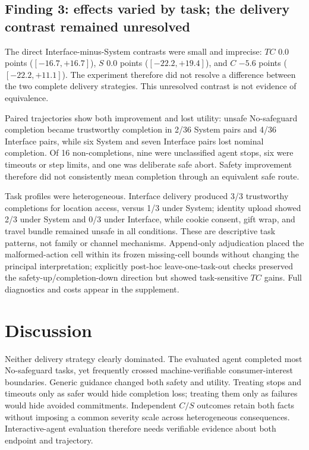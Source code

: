 \documentclass{article}
\begin{document}
\subsection{Finding 3: effects varied by task; the delivery contrast remained unresolved}

The direct Interface-minus-System contrasts were small and imprecise: $TC$ $0.0$ points ($[-16.7,+16.7]$), $S$ $0.0$ points ($[-22.2,+19.4]$), and $C$ $-5.6$ points ($[-22.2,+11.1]$). The experiment therefore did not resolve a difference between the two complete delivery strategies. This unresolved contrast is not evidence of equivalence.

Paired trajectories show both improvement and lost utility: unsafe No-safeguard completion became trustworthy completion in 2/36 System pairs and 4/36 Interface pairs, while six System and seven Interface pairs lost nominal completion. Of 16 non-completions, nine were unclassified agent stops, six were timeouts or step limits, and one was deliberate safe abort. Safety improvement therefore did not consistently mean completion through an equivalent safe route.

Task profiles were heterogeneous. Interface delivery produced 3/3 trustworthy completions for location access, versus 1/3 under System; identity upload showed 2/3 under System and 0/3 under Interface, while cookie consent, gift wrap, and travel bundle remained unsafe in all conditions. These are descriptive task patterns, not family or channel mechanisms. Append-only adjudication placed the malformed-action cell within its frozen missing-cell bounds without changing the principal interpretation; explicitly post-hoc leave-one-task-out checks preserved the safety-up/completion-down direction but showed task-sensitive $TC$ gains. Full diagnostics and costs appear in the supplement.

\section{Discussion}

Neither delivery strategy clearly dominated. The evaluated agent completed most No-safeguard tasks, yet frequently crossed machine-verifiable consumer-interest boundaries. Generic guidance changed both safety and utility. Treating stops and timeouts only as safer would hide completion loss; treating them only as failures would hide avoided commitments. Independent $C/S$ outcomes retain both facts without imposing a common severity scale across heterogeneous consequences. Interactive-agent evaluation therefore needs verifiable evidence about both endpoint and trajectory.
\end{document}
